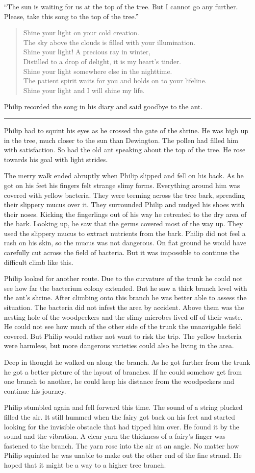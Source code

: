 \documentclass[10pt, draft]{memoir}
\renewcommand{\pfbreakdisplay}{\bigskip \ding{166} \bigskip}
\newcommand{\secbreak}{\fancybreak{\pfbreakdisplay}}
\newcommand{\sunsong}{
  Shine your light on your cold creation. \\
  The sky above the clouds is filled with your illumination. \\
  Shine your light! A precious ray in winter, \\
  Distilled to a drop of delight, it is my heart's tinder. \\
  Shine your light somewhere else in the nighttime. \\
  The patient spirit waits for you and holds on to your lifeline. \\
  Shine your light and I will shine my life.
}
\begin{document}
``The sun is waiting for us at the top of the tree. But I cannot go any
further. Please, take this song to the top of the tree.''


\begin{verse}
\sunsong
\end{verse}


Philip recorded the song in his diary and said goodbye to the ant.

\secbreak

Philip had to squint his eyes as he crossed the gate of the shrine. He was high
up in the tree, much closer to the sun than Dewington. The pollen had filled
him with satisfaction. So had the old ant speaking about the top of the tree.
He rose towards his goal with light strides.

The merry walk ended abruptly when Philip slipped and fell on his back. As he
got on his feet his fingers felt strange slimy forms. Everything around him was
covered with yellow bacteria. They were teeming across the tree bark, spreading
their slippery mucus over it. They surrounded Philip and nudged his shoes with
their noses. Kicking the fingerlings out of his way he retreated to the dry
area of the bark. Looking up, he saw that the germs covered most of the way up.
They used the slippery mucus to extract nutrients from the bark. Philip did not
feel a rash on his skin, so the mucus was not dangerous. On flat ground he
would have carefully cut across the field of bacteria. But it was impossible to
continue the difficult climb like this.

Philip looked for another route. Due to the curvature of the trunk he could not
see how far the bacterium colony extended. But he saw a thick branch level with
the ant's shrine. After climbing onto this branch he was better able to assess
the situation. The bacteria did not infest the area by accident. Above them was
the nesting hole of the woodpeckers and the slimy microbes lived off of their
waste. He could not see how much of the other side of the trunk the unnavigable
field covered. But Philip would rather not want to risk the trip. The yellow
bacteria were harmless, but more dangerous varieties could also be living in
the area.

Deep in thought he walked on along the branch. As he got further from the trunk
he got a better picture of the layout of branches. If he could somehow get from
one branch to another, he could keep his distance from the woodpeckers and
continue his journey.

Philip stumbled again and fell forward this time. The sound of a string plucked
filled the air. It still hummed when the fairy got back on his feet and started
looking for the invisible obstacle that had tipped him over. He found it by the
sound and the vibration. A clear yarn the thickness of a fairy's finger was
fastened to the branch. The yarn rose into the air at an angle. No matter how
Philip squinted he was unable to make out the other end of the fine strand. He
hoped that it might be a way to a higher tree branch.
\end{document}
